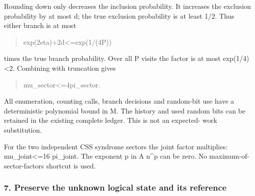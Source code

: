 \documentclass[
]{article}
\begin{document}
Rounding down only decreases the inclusion probability. It increases the
exclusion probability by at most d; the true exclusion probability is at
least 1/2. Thus either branch is at most

\begin{quote}\small\ttfamily\raggedright\setlength{\parskip}{0pt}
\noindent e\allowbreak{}x\allowbreak{}p\allowbreak{}(\allowbreak{}2\allowbreak{}e\allowbreak{}t\allowbreak{}a\allowbreak{})\allowbreak{}+\allowbreak{}2\allowbreak{}d\allowbreak{}\hspace*{0.525em}\allowbreak{}<\allowbreak{}=\allowbreak{}\hspace*{0.525em}\allowbreak{}e\allowbreak{}x\allowbreak{}p\allowbreak{}(\allowbreak{}1\allowbreak{}/\allowbreak{}(\allowbreak{}4\allowbreak{}P\allowbreak{})\allowbreak{})\par
\end{quote}

times the true branch probability. Over all P visits the factor is at
most exp(1/4)\textless2. Combining with truncation gives

\begin{quote}\small\ttfamily\raggedright\setlength{\parskip}{0pt}
\noindent m\allowbreak{}u\allowbreak{}\_\allowbreak{}s\allowbreak{}e\allowbreak{}c\allowbreak{}t\allowbreak{}o\allowbreak{}r\allowbreak{}\hspace*{0.525em}\allowbreak{}<\allowbreak{}=\allowbreak{}\hspace*{0.525em}\allowbreak{}4\allowbreak{}\hspace*{0.525em}\allowbreak{}p\allowbreak{}i\allowbreak{}\_\allowbreak{}s\allowbreak{}e\allowbreak{}c\allowbreak{}t\allowbreak{}o\allowbreak{}r\allowbreak{}.\par
\end{quote}

All enumeration, counting calls, branch decisions and random-bit use
have a deterministic polynomial bound in M. The history and used random
bits can be retained in the existing complete ledger. This is not an
expected- work substitution.

For the two independent CSS syndrome sectors the joint factor
multiplies: mu\_joint\textless=16 pi\_joint. The exponent p in A n\^{}p
can be zero. No maximum-of- sector-factors shortcut is used.

\subsubsection{7. Preserve the unknown logical state and its
reference}\label{preserve-the-unknown-logical-state-and-its-reference}
\end{document}
